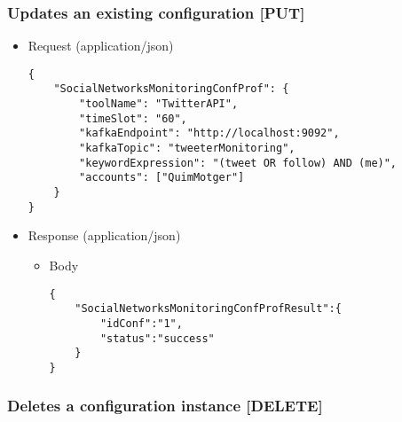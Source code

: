 \subsubsection{Updates an existing configuration
{[}PUT{]}}\label{updates-an-existing-configuration-put}

\begin{itemize}
\item
  Request (application/json)

\begin{verbatim}
{
    "SocialNetworksMonitoringConfProf": {
        "toolName": "TwitterAPI",
        "timeSlot": "60",
        "kafkaEndpoint": "http://localhost:9092",
        "kafkaTopic": "tweeterMonitoring",
        "keywordExpression": "(tweet OR follow) AND (me)",
        "accounts": ["QuimMotger"]
    }
}
\end{verbatim}
\item
  Response (application/json)

  \begin{itemize}
  \item
    Body

\begin{verbatim}
{
    "SocialNetworksMonitoringConfProfResult":{
        "idConf":"1",
        "status":"success"
    }
}
\end{verbatim}
  \end{itemize}
\end{itemize}

\subsubsection{Deletes a configuration instance
{[}DELETE{]}}